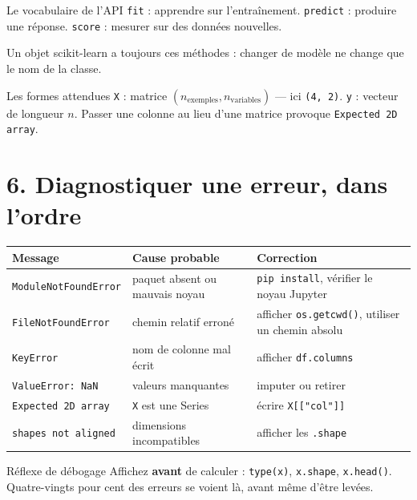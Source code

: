 \documentclass[9.5pt,a4paper]{article}
\begin{document}
\begin{astuce}{Le vocabulaire de l'API}
\texttt{fit} : apprendre sur l'entraînement. \quad
\texttt{predict} : produire une réponse. \quad
\texttt{score} : mesurer sur des données nouvelles.

Un objet scikit-learn a toujours ces méthodes : changer de modèle ne change
que le nom de la classe.
\end{astuce}

\begin{piege}{Les formes attendues}
\texttt{X} : matrice $(n_{\text{exemples}}, n_{\text{variables}})$ --- ici
\texttt{(4, 2)}. \quad \texttt{y} : vecteur de longueur $n$.
Passer une colonne au lieu d'une matrice provoque
\texttt{Expected 2D array}.
\end{piege}

\section*{\color{bleu}6. Diagnostiquer une erreur, dans l'ordre}
\begin{center}
\footnotesize
\begin{tabular}{@{}p{}p{}p{}@{}}
\toprule
\textbf{Message} & \textbf{Cause probable} & \textbf{Correction} \\
\midrule
\texttt{ModuleNotFoundError} & paquet absent ou mauvais noyau &
\texttt{pip install}, vérifier le noyau Jupyter \\
\texttt{FileNotFoundError} & chemin relatif erroné &
afficher \texttt{os.getcwd()}, utiliser un chemin absolu \\
\texttt{KeyError} & nom de colonne mal écrit & afficher \texttt{df.columns} \\
\texttt{ValueError: NaN} & valeurs manquantes & imputer ou retirer \\
\texttt{Expected 2D array} & \texttt{X} est une Series & écrire
\texttt{X[["col"]]} \\
\texttt{shapes not aligned} & dimensions incompatibles & afficher les
\texttt{.shape} \\
\bottomrule
\end{tabular}
\end{center}

\begin{astuce}{Réflexe de débogage}
Affichez \textbf{avant} de calculer : \texttt{type(x)}, \texttt{x.shape},
\texttt{x.head()}. Quatre-vingts pour cent des erreurs se voient là, avant
même d'être levées.
\end{astuce}
\end{document}
